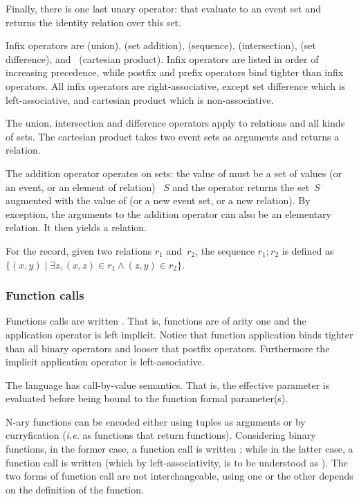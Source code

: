 Finally, there is one last unary operator: \synt{\T{[}\NT{expr}\T{]}}
that evaluate  to an event set and returns the identity
relation over this set.

Infix operators are
\T{|} (union), \T{++} (set addition),
\T{;} (sequence), \T{\&} (intersection), \T{\textbackslash} (set difference),
and~\T{*} (cartesian product).
Infix operators  are listed in order of increasing precedence,
while  postfix and prefix operators bind tighter than infix operators.
All infix operators are right-associative,
except set difference which is left-associative, and cartesian product
which is non-associative.

The union, intersection and difference operators apply to relations
and all kinds of sets. The cartesian product takes two event sets as arguments and returns
a relation.

The addition operator  operates on
sets: the value of  must be a set of values (or an event, or
an element of relation)
~$S$ and the operator returns the set~$S$ augmented with the value of
 (or a new event set, or a new relation).
By exception, the arguments to the addition operator can also be an elementary relation. It then yields a relation.

For the record, given two relations $r_1$ and~$r_2$,
the sequence $r_1; r_2$ is defined
as $\{ (x,y) \mid \exists z, (x,z) \in r_1 \wedge (z,y) \in r_2\}$.

\subsubsection*{Function calls}
Functions calls are written .
That is, functions are of arity one and the application operator
is left implicit. Notice that function application binds tighter
than all binary operators and looser that postfix operators.
Furthermore the implicit application operator is left-associative.

The \cat{} language has call-by-value semantics. That is,
the effective parameter
 is evaluated before being bound to the
function formal parameter(s).

N-ary functions can be encoded either using tuples as arguments
or by curryfication (\emph{i.e.} as functions that return functions).
Considering binary functions, in the former case,
a function call is written
;
while in the latter case, a function call is written
(which by left-associativity, is to be understood
as ).
The two forms of function call are not interchangeable, using one or the
other depends on the definition of the function.


